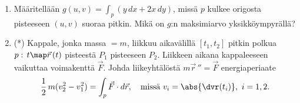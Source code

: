 \begin{enumerate}
\item
Määritellään $g(u,v)=\int_p (y\,dx+2x\,dy)$, missä $p$ kulkee origosta pisteeseen $(u,v)$
suoraa pitkin. Mikä on $g$:n maksimiarvo yksikköympyrällä?

\item (*)
Kappale, jonka massa $=m$, liikkuu aikavälillä $[t_1,t_2]$ pitkin polkua $p:\,t\map\vec r\,(t)$
pisteestä $P_1$ pisteeseen $P_2$. Liikkeen aikana kappaleeseen vaikuttaa voimakenttä $\vec F$.
Johda liikeyhtälöstä $m\vec r\,''=\vec F$ energiaperiaate
\[
\frac{1}{2}\,m(v_2^2-v_1^2)=\int_p \vec F \cdot d\vec r, \quad 
           \text{missä}\ v_i=\abs{\dvr(t_i)},\ i=1,2.
\]
\end{enumerate}